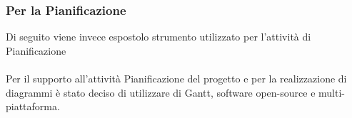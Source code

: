 \subsubsection{Per la Pianificazione}
Di seguito viene invece espostolo  strumento utilizzato per l’attività di Pianificazione
\paragraph{}
Per il supporto all’attività Pianificazione del progetto e per la realizzazione di diagrammi è stato deciso di utilizzare di Gantt, software open-source e multi-piattaforma.

